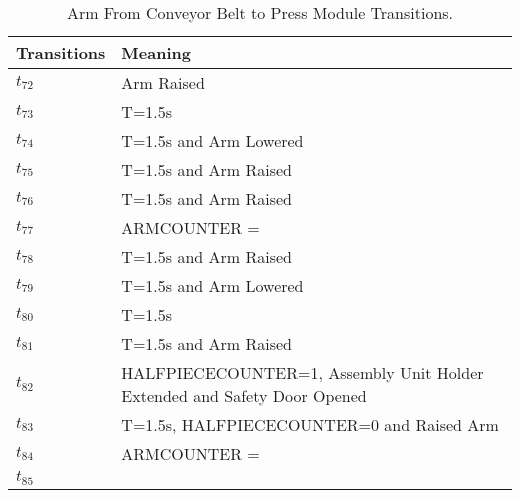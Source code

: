 \begin{table}[H]
\caption{Arm From Conveyor Belt to Press Module Transitions.}
\centering
\begin{tabular}{M{5cm}M{10cm}}
Transitions & Meaning\\
\hline
\hyperlink{partialNet:t721}{\hypertarget{partialTable:t72}{$t_{72}$}} & Arm Raised\\
\hyperlink{partialNet:tt731}{\hypertarget{partialTable:tt73}{$t_{73}$}} & T=1.5s\\
\hyperlink{partialNet:tt741}{\hypertarget{partialTable:tt74}{$t_{74}$}} & T=1.5s and Arm Lowered\\
\hyperlink{partialNet:tt751}{\hypertarget{partialTable:tt75}{$t_{75}$}} & T=1.5s and Arm Raised\\
\hyperlink{partialNet:tt761}{\hypertarget{partialTable:tt76}{$t_{76}$}} & T=1.5s and Arm Raised\\
\hyperlink{partialNet:t771}{\hypertarget{partialTable:t77}{$t_{77}$}} & ARMCOUNTER = \\
\hyperlink{partialNet:tt781}{\hypertarget{partialTable:tt78}{$t_{78}$}} & T=1.5s and Arm Raised\\
\hyperlink{partialNet:tt791}{\hypertarget{partialTable:tt79}{$t_{79}$}} & T=1.5s and Arm Lowered\\
\hyperlink{partialNet:tt801}{\hypertarget{partialTable:tt80}{$t_{80}$}} & T=1.5s\\
\hyperlink{partialNet:tt811}{\hypertarget{partialTable:tt81}{$t_{81}$}} & T=1.5s and Arm Raised\\
\hyperlink{partialNet:t821}{\hypertarget{partialTable:t82}{$t_{82}$}} & HALFPIECECOUNTER=1, Assembly Unit Holder Extended and Safety Door Opened\\
\hyperlink{partialNet:tt831}{\hypertarget{partialTable:tt83}{$t_{83}$}} & T=1.5s, HALFPIECECOUNTER=0 and Raised Arm\\
\hyperlink{partialNet:t841}{\hypertarget{partialTable:t84}{$t_{84}$}} & ARMCOUNTER = \\
\hyperlink{partialNet:t851}{\hypertarget{partialTable:t85}{$t_{85}$}} & \\
\end{tabular}
\end{table}
